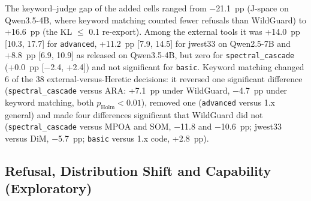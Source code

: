 The keyword--judge gap of the added cells ranged from $-$21.1~pp (J-space on Qwen3.5-4B, where keyword matching
counted fewer refusals than WildGuard) to +16.6~pp (the KL $\le$ 0.1 re-export). Among the external tools it was
+14.0~pp [10.3, 17.7] for \texttt{advanced}, +11.2~pp [7.9, 14.5] for jwest33 on Qwen2.5-7B and +8.8~pp [6.9, 10.9]
as released on Qwen3.5-4B, but zero for \texttt{spectral\_cascade} (+0.0~pp [$-$2.4, +2.4]) and not significant for
\texttt{basic}. Keyword matching changed 6 of the 38 external-versus-Heretic decisions: it reversed one
significant difference (\texttt{spectral\_cascade} versus ARA: +7.1~pp under WildGuard, $-$4.7~pp under keyword matching, both $p_\mathrm{Holm}<0.01$), removed one (\texttt{advanced}
versus 1.x general) and made four differences significant that WildGuard did not (\texttt{spectral\_cascade} versus
MPOA and SOM, $-$11.8 and $-$10.6~pp; jwest33 versus DiM, $-$5.7~pp; \texttt{basic} versus 1.x code, +2.8~pp).

\subsection{Refusal, Distribution Shift and Capability (Exploratory)}
\label{sec:res-tradeoff}

